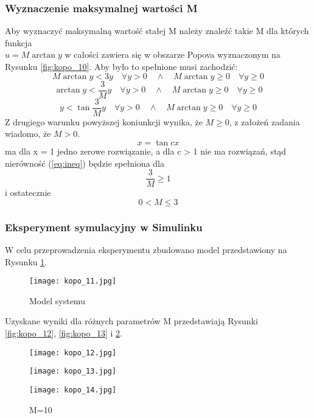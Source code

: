 \documentclass[a4paper,11pt]{article}
\begin{document}
\subsubsection{Wyznaczenie maksymalnej wartości M}
Aby wyznaczyć maksymalną wartość stałej M należy znaleźć takie M dla których funkcja \\ \( u = M\arctan y \) w całości zawiera się w obszarze Popova wyznaczonym na Rysunku \ref{fig:kopo_10}.
Aby było to spełnione musi zachodzić:
\begin{equation} \label{eq:ineq}
M\arctan y < 3y \quad \forall y > 0 \quad \wedge \quad M\arctan y \geq 0 \quad \forall y \geq 0
\end{equation}
\begin{equation*}
\arctan y < \frac{3}{M} y \quad \forall y > 0 \quad \wedge \quad M\arctan y \geq 0 \quad \forall y \geq 0
\end{equation*}
\begin{equation*}
y < \tan \frac{3}{M} y \quad \forall y > 0 \quad \wedge \quad M\arctan y \geq 0 \quad \forall y \geq 0
\end{equation*}
Z drugiego warunku powyższej koniunkcji wynika, że \( M \geq 0 \), z założeń zadania wiadomo, że \( M > 0 \). 
\begin{equation*}
x = \tan cx
\end{equation*}
ma dla x = 1 jedno zerowe rozwiązanie, a dla c > 1 nie ma rozwiązań, stąd nierówność (\ref{eq:ineq}) będzie spełniona dla 
\begin{equation*}
\frac{3}{M} \geq 1
\end{equation*}
i ostatecznie 
\begin{equation*}
0 < M \leq 3
\end{equation*}
\subsubsection{Eksperyment symulacyjny w Simulinku}
W celu przeprowadzenia eksperymentu zbudowano model przedstawiony na Rysunku \ref{fig:kopo_11}. 
\begin{figure}[H]
\centerline{\texttt{[image: kopo\_11.jpg]}}
\centering
\caption{Model systemu}
\label{fig:kopo_11}
\end{figure}
Uzyskane wyniki dla różnych parametrów M przedstawiają Rysunki \ref{fig:kopo_12}, \ref{fig:kopo_13} i \ref{fig:kopo_14}.
\begin{figure}[H]
  \texttt{[image: kopo\_12.jpg]}
  \caption{M=2}\label{fig:kopo_12}
\endminipage\hfill
{}
  \texttt{[image: kopo\_13.jpg]}
  \caption{M=4}\label{fig:kopo_13}
\endminipage\hfill
{}%
  \texttt{[image: kopo\_14.jpg]}
  \caption{M=10}\label{fig:kopo_14}
\endminipage
\end{figure}
\end{document}
